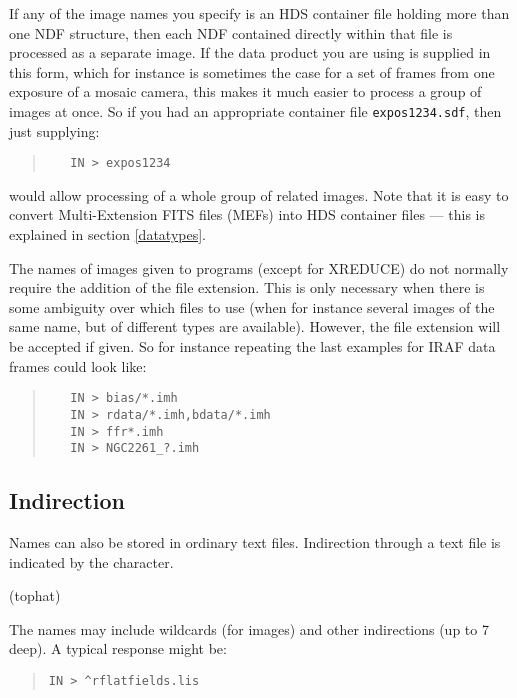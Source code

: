 \documentclass[twoside,11pt]{article}
\newcommand{\htmlref}[2]{#1}
\newcommand{\latexhtml}[2]{#1}
\renewcommand{\_}{\texttt{\symbol{95}}}
\newcommand{\ttsize}{\latexhtml{\small}{}}
\newenvironment{myquote}{\begin{quote}\ttsize}{\end{quote}}
\newcommand{\text}[1]{{\ttsize \tt #1}}
\newcommand{\xroutine}[1]{\htmlref{{\sc #1}}{#1}}
\begin{document}
If any of the image names you specify is an HDS container file
holding more than one NDF structure, then each NDF contained directly 
within that file is processed as a separate image.  
If the data product you are using is supplied in this form, 
which for instance is sometimes the case for a set of frames 
from one exposure of a mosaic camera, 
this makes it much easier to process a group of images at once.
So if you had an 
appropriate container file \text{expos1234.sdf}, then just supplying:
\begin{myquote}
\begin{verbatim}
   IN > expos1234
\end{verbatim}
\end{myquote}
would allow processing of a whole group of related images.
Note that it is easy to convert Multi-Extension FITS files (MEFs)
into HDS container files --- this is explained in section \ref{datatypes}.

The names of images given to programs (except for \xroutine{XREDUCE})
do not normally require the addition of the file extension. This
is only necessary when there is some ambiguity over which files to
use (when for instance several images of the same name, but of
different types are available). However, the file extension will
be accepted if given. So for instance repeating the last examples
for IRAF data frames could look like:
\begin{myquote}
\begin{verbatim}
   IN > bias/*.imh
   IN > rdata/*.imh,bdata/*.imh
   IN > ffr*.imh
   IN > NGC2261_?.imh
\end{verbatim}
\end{myquote}

\subsection{Indirection}
Names can also be stored in ordinary text files. Indirection through a
text file is indicated by the character.

\begin{description}
   \item \hspace{13pt}{\bf$^\wedge$}\hspace{3ex}   (tophat)
\end{description}

The names may include wildcards (for images) and other indirections (up to
7 deep). A typical response might be:
\begin{myquote}
\begin{verbatim}
IN > ^rflatfields.lis
\end{verbatim}
\end{myquote}
\end{document}
